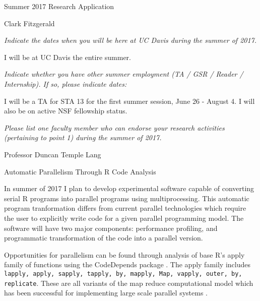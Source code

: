 \documentclass[12pt]{article}
\begin{document}
\begin{center}
    \large Summer 2017 Research Application

    \normalsize Clark Fitzgerald
\end{center}

\emph{Indicate the dates when you will be here at UC Davis during the summer of
2017.}

I will be at UC Davis the entire summer.
   
\emph{Indicate whether you have other summer employment (TA / GSR  / Reader / Internship).
If so, please indicate dates:}

I will be a TA for STA 13 for the first summer session, June 26 - August 4.
I will also be on active NSF fellowship status.
   
\emph{Please list one faculty member who can endorse your
research activities (pertaining to point 1) during the summer of 2017.}

Professor Duncan Temple Lang

\newpage

\begin{center}
    \large Automatic Parallelism Through R Code Analysis 
\end{center}

\hfill

In summer of 2017 I plan to develop experimental software capable of
converting serial R programs into parallel programs using multiprocessing.
This automatic program tranformation differs from current parallel
technologies which require the user to explicitly write code for a given
parallel programming model. The software will have two major components:
performance profiling, and programmatic transformation of the code into a
parallel version.


Opportunities for parallelism can be found through analysis of base R's
apply family of functions using the CodeDepends package
\cite{R-CodeDepends}. The apply family includes \texttt{lapply, apply, sapply,
tapply, by, mapply, Map, vapply, outer, by, replicate}. These are all
variants of the map reduce computational model which has
been successful for implementing large scale parallel systems
\cite{dean2008mapreduce}. 
\end{document}
